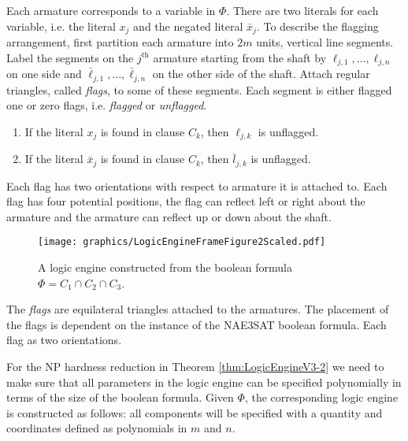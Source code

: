   Each armature corresponds to a variable in $\Phi$. There are two literals for each variable, i.e. the literal $x_j$ and the negated literal 
 $\bar{x}_j$.   
 To describe the flagging arrangement, first partition each armature into $2m$ units, vertical line segments. Label the segments on the $j^\text{th}$ armature starting from the shaft by $\ell_{j,1},\ldots,\ell_{j,n}$ on one side and  $\bar{\ell}_{j,1},\ldots,\bar{\ell}_{j,n}$ on the other side of the shaft.  
 Attach regular triangles, called \textit{flags}, to some of these segments. 
 Each segment is either flagged one or zero flags, i.e. \textit{flagged} or \textit{unflagged}. 

\begin{enumerate}
 \item If the literal $x_j$ is found in clause $C_k$, then $\ell_{j,k}$ is unflagged.
 \item If the literal $\bar{x}_j$ is found in clause $C_k$, then $\bar{l}_{j,k}$ is unflagged.
\end{enumerate}

Each flag has two orientations with respect to armature it is attached to.  Each flag has four potential positions, the flag can reflect left or right about the armature and the armature can reflect up or down about the shaft.
\begin{figure}[!h]
\begin{center}
\texttt{[image: graphics/LogicEngineFrameFigure2Scaled.pdf]}
\caption{A logic engine constructed from the boolean formula $\Phi = C_1 \cap C_2 \cap C_3$.}
\label{fig:LogicEngineFrameFigure2Scaled.pdf}
\end{center}
\end{figure}
The \textit{flags} are equilateral triangles
attached to the armatures.  The placement of the flags is dependent on the instance of the NAE3SAT 
boolean formula. Each flag as two orientations. 

For the NP hardness reduction in Theorem \ref{thm:LogicEngineV3-2} we need to make sure that all parameters in the logic engine can be specified polynomially in terms of the size of the boolean formula. Given $\Phi$, the corresponding logic engine is constructed as follows: all components will be specified with a 
quantity and coordinates defined as polynomials in $m$ and $n$.

